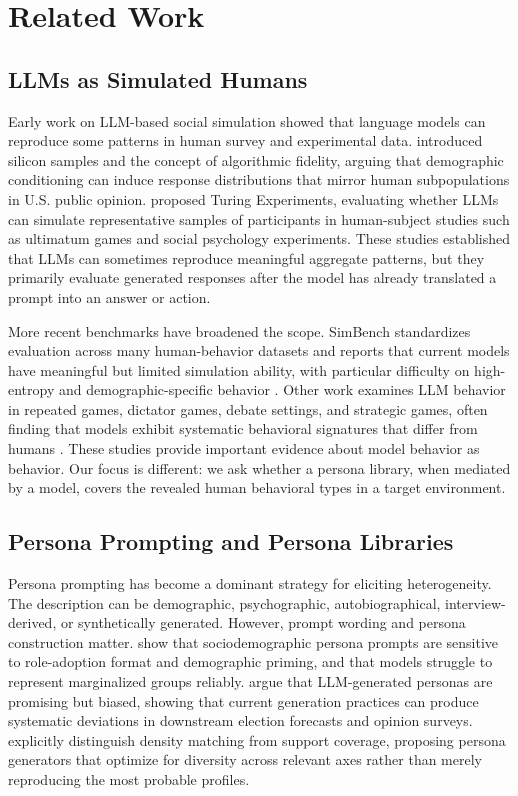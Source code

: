 \documentclass[11pt]{article}
\begin{document}
\section{Related Work}

\subsection{LLMs as Simulated Humans}

Early work on LLM-based social simulation showed that language models can reproduce some patterns in human survey and experimental data. \citet{argyle2023silicon} introduced silicon samples and the concept of algorithmic fidelity, arguing that demographic conditioning can induce response distributions that mirror human subpopulations in U.S. public opinion. \citet{aher2023turing} proposed Turing Experiments, evaluating whether LLMs can simulate representative samples of participants in human-subject studies such as ultimatum games and social psychology experiments. These studies established that LLMs can sometimes reproduce meaningful aggregate patterns, but they primarily evaluate generated responses after the model has already translated a prompt into an answer or action.

More recent benchmarks have broadened the scope. SimBench standardizes evaluation across many human-behavior datasets and reports that current models have meaningful but limited simulation ability, with particular difficulty on high-entropy and demographic-specific behavior \citep{hu2025simbench}. Other work examines LLM behavior in repeated games, dictator games, debate settings, and strategic games, often finding that models exhibit systematic behavioral signatures that differ from humans \citep{akata2025repeatedgames}. These studies provide important evidence about model behavior as behavior. Our focus is different: we ask whether a persona library, when mediated by a model, covers the revealed human behavioral types in a target environment.

\subsection{Persona Prompting and Persona Libraries}

Persona prompting has become a dominant strategy for eliciting heterogeneity. The description can be demographic, psychographic, autobiographical, interview-derived, or synthetically generated. However, prompt wording and persona construction matter. \citet{lutz2025prompt} show that sociodemographic persona prompts are sensitive to role-adoption format and demographic priming, and that models struggle to represent marginalized groups reliably. \citet{li2025catch} argue that LLM-generated personas are promising but biased, showing that current generation practices can produce systematic deviations in downstream election forecasts and opinion surveys. \citet{paglieri2026persona} explicitly distinguish density matching from support coverage, proposing persona generators that optimize for diversity across relevant axes rather than merely reproducing the most probable profiles.
\end{document}
